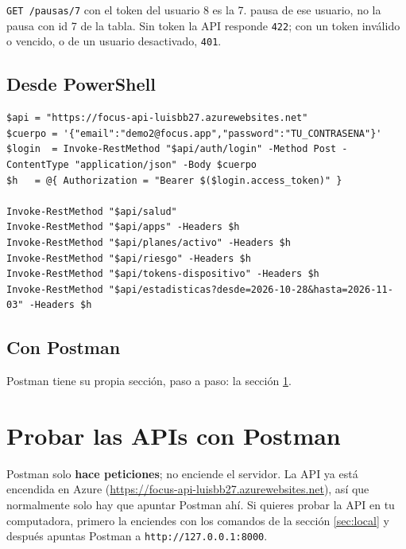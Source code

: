 \documentclass[11pt,a4paper]{article}
\newcommand{\ruta}[1]{\texttt{\color{marino}#1}}
\begin{document}
\begin{nota}
\ruta{GET /pausas/7} con el token del usuario 8 es la 7.\textordmasculine{} pausa de ese usuario, no la pausa
con id 7 de la tabla. Sin token la API responde \texttt{422}; con un token inválido o vencido, o de un
usuario desactivado, \texttt{401}.
\end{nota}

\subsection{Desde PowerShell}
\begin{lstlisting}[language=texto]
$api = "https://focus-api-luisbb27.azurewebsites.net"
$cuerpo = '{"email":"demo2@focus.app","password":"TU_CONTRASENA"}'
$login  = Invoke-RestMethod "$api/auth/login" -Method Post -ContentType "application/json" -Body $cuerpo
$h   = @{ Authorization = "Bearer $($login.access_token)" }

Invoke-RestMethod "$api/salud"
Invoke-RestMethod "$api/apps" -Headers $h
Invoke-RestMethod "$api/planes/activo" -Headers $h
Invoke-RestMethod "$api/riesgo" -Headers $h
Invoke-RestMethod "$api/tokens-dispositivo" -Headers $h
Invoke-RestMethod "$api/estadisticas?desde=2026-10-28&hasta=2026-11-03" -Headers $h
\end{lstlisting}

\subsection{Con Postman}
Postman tiene su propia sección, paso a paso: la sección \ref{sec:postman}.

\section{Probar las APIs con Postman}\label{sec:postman}

\begin{nota}
Postman solo \textbf{hace peticiones}; no enciende el servidor. La API ya está encendida en Azure
(\url{https://focus-api-luisbb27.azurewebsites.net}), así que normalmente solo hay que apuntar Postman ahí.
Si quieres probar la API en tu computadora, primero la enciendes con los comandos de la sección
\ref{sec:local} y después apuntas Postman a \texttt{http://127.0.0.1:8000}.
\end{nota}
\end{document}
